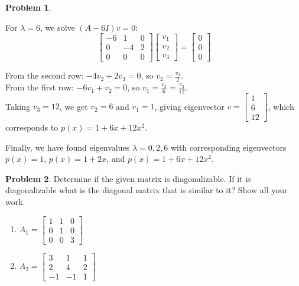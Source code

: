 \documentclass[12pt, oneside]{amsart}
\theoremstyle{definition}
\newtheorem{prob}{Problem}
\begin{document}
\begin{prob}
\begin{solution}
For $\lambda = 6$, we solve $(A - 6I)v = 0$:
\[
\begin{bmatrix} -6 & 1 & 0 \\ 0 & -4 & 2 \\ 0 & 0 & 0 \end{bmatrix} \begin{bmatrix} v_1 \\ v_2 \\ v_3 \end{bmatrix} = \begin{bmatrix} 0 \\ 0 \\ 0 \end{bmatrix}
\]

From the second row: $-4v_2 + 2v_3 = 0$, so $v_2 = \frac{v_3}{2}$.\\
From the first row: $-6v_1 + v_2 = 0$, so $v_1 = \frac{v_2}{6} = \frac{v_3}{12}$.\\
Taking $v_3 = 12$, we get $v_2 = 6$ and $v_1 = 1$, giving eigenvector $v = \begin{bmatrix} 1 \\ 6 \\ 12 \end{bmatrix}$, which corresponds to $p(x) = 1 + 6x + 12x^2$.

Finally, we have found eigenvalues $\lambda = 0, 2, 6$ with corresponding eigenvectors $p(x) = 1$, $p(x) = 1 + 2x$, and $p(x) = 1 + 6x + 12x^2$.
    
    \end{solution}
\end{prob}

\begin{prob}
    Determine if the given matrix is diagonalizable. If it is diagonalizable what is the diagonal matrix that is similar to it? Show all your work.
    \begin{enumerate}
        \item $A_1 = \left[\begin{matrix} 1 & 1 & 0 \\ 0 & 1 & 0 \\ 0 & 0 & 3\end{matrix}\right]$

        \item $A_2 = \left[\begin{matrix} 3 & 1 & 1 \\ 2 & 4 & 2 \\ -1 & -1 & 1\end{matrix}\right]$
    \end{enumerate}
\end{prob}
\end{document}
